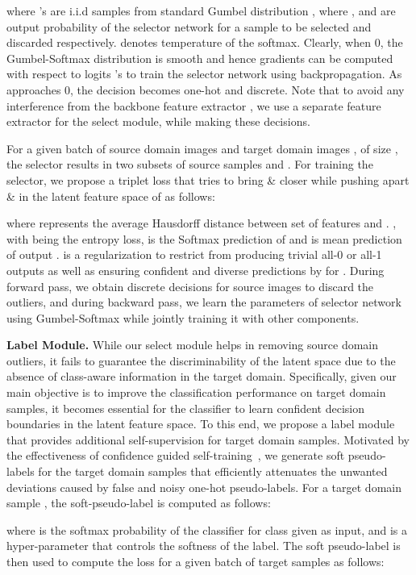 \documentclass[10pt,twocolumn,letterpaper]{article}
\begin{document}
where 's are i.i.d samples from standard Gumbel distribution , where ,
 and  are output probability of the selector network for a sample to be selected and discarded respectively.  denotes temperature of the softmax. Clearly, when  0, the Gumbel-Softmax distribution is smooth and hence gradients can be computed with respect to  logits 's to train the selector network using backpropagation. As  approaches 0, the decision  becomes one-hot and discrete.
Note that to avoid any interference from the backbone feature extractor , we use a separate feature extractor for the select module, while making these decisions.   

For a given batch of source domain images  and target domain images , of size , the selector results in two subsets of source samples  and . For training the selector, we propose a triplet loss  that tries to bring  \&  closer while pushing apart  \&  in the latent feature space of  as follows:

where  represents the average Hausdorff distance between set of features  and . , with  being the entropy loss,  is the Softmax prediction of  and  is mean prediction of output .  is a regularization to restrict  from producing trivial all-0 or all-1 outputs as well as ensuring confident and diverse predictions by  for . During forward pass, we obtain discrete decisions for source images to discard the outliers, and during backward pass, we learn the parameters of selector network using Gumbel-Softmax while jointly training it with other components.

\vspace{1mm}
\noindent\textbf{Label Module.} While our select module helps in removing source domain outliers, it fails to guarantee the discriminability of the latent space due to the absence of class-aware information in the target domain. Specifically, given our main objective is to improve the classification performance on target domain samples, it becomes essential for the classifier to learn confident decision boundaries in the latent feature space. To this end, we propose a label module that provides additional self-supervision for target domain samples. Motivated by the effectiveness of confidence guided self-training~\cite{zou2019confidence}, we generate soft pseudo-labels for the target domain samples that efficiently attenuates the unwanted deviations caused by false and noisy one-hot pseudo-labels. For a target domain sample , the soft-pseudo-label  is computed as follows:

where  is the softmax probability of the classifier for class  given  as input, and  is a hyper-parameter that controls the softness of the label. 
The soft pseudo-label  is then used to compute the loss  for a given batch of target samples  as follows:
\end{document}
